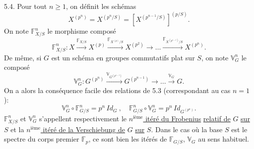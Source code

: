 \margin{\unsure{$\cdot\ \cdot\ \nearrow$}}

5.4. \quad Pour tout $n \geq 1$, on définit les schémas
\[ X^{(p^n)} = X^{(p^n/S)} = [X^{(p^{n-1}/S)}]^{(p/S)} . \]
On note $\mathbb{F}^n_{X/S}$ le morphisme composé
\[ \mathbb{F}^n_{X/S} : X \xrightarrow{\mathbb{F}_{X/S}} X^{(p)} \xrightarrow{\mathbb{F}_{X^{(p)}/S}} X^{(p^2)} \to \dots \xrightarrow{\mathbb{F}_{X^{(p^{n-1})}/S}} X^{(p^n)} . \]
De même, si $G$ est un schéma en groupes commutatifs plat sur $S$, on
note $\mathbb{V}^n_G$ le composé
\[ \mathbb{V}^n_G : G^{(p^n)} \xrightarrow{\mathbb{V}_{G^{(p^{n-1})}}} G^{(p^{n-1})} \to \dots \xrightarrow{\mathbb{V}_G} G . \]
On a alors la conséquence facile des relations de 5.3 (correspondant
au cas $n = 1$):
\[ \mathbb{V}^n_G \circ \mathbb{F}^n_{G/S} = p^n \, Id_G \ , \quad \mathbb{F}^n_{G/S} \circ \mathbb{V}^n_G = p^n \, Id_{G^{(p^n)}} . \]
$\mathbb{F}^n_{X/S}$ et $\mathbb{V}^n_G$ s'appellent respectivement le \uline{$n^{\text{ième}}$ itéré du Frobenius}
\uline{relatif de} $G$ \uline{sur} $S$ et la \uline{$n^{\text{ième}}$ itéré de la Verschiebung de} $G$ \uline{sur} $S$.
Dans le cas où la base $S$ est le spectre du corps premier $\mathbb{F}_p$, ce sont
bien les itérés de $\mathbb{F}_{G/S}$, $\mathbb{V}_G$ au sens habituel.

